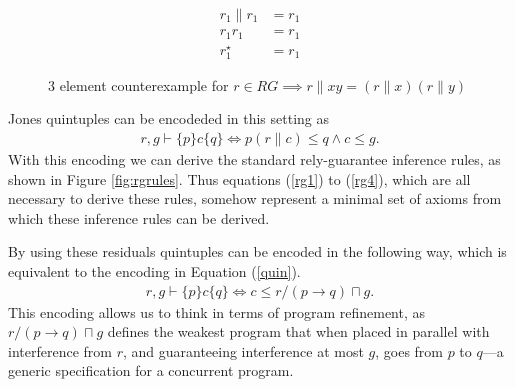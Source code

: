 \documentclass{llncs}
\begin{document}
\begin{figure}[t]
\centering
\begin{minipage}{0.24\textwidth}
\end{minipage}
\begin{minipage}{0.24\textwidth}
\begin{align*}
r_1 \| r_1 &= r_1\\
r_1 r_1 &= r_1\\
r_1^\star &= r_1
\end{align*}
\end{minipage}
\caption{3 element counterexample for $r \in RG \implies r\|xy = (r\|x)(r\|y)$}
\label{fig:rg3}
\end{figure}

Jones quintuples can be encodeded in this setting as
\begin{align}
r, g \vdash \{p\} c \{q\} \iff p(r\|c) \le q \land c \le g. \label{quin}
\end{align}
With this encoding we can derive the standard rely-guarantee inference
rules, as shown in Figure \ref{fig:rgrules}. Thus equations
(\ref{rg1}) to (\ref{rg4}), which are all necessary to derive these
rules, somehow represent a minimal set of axioms from which these
inference rules can be derived.

By using these residuals quintuples can be encoded in the following way,
which is equivalent to the encoding in Equation (\ref{quin}).
\begin{align}
r, g \vdash \{p\} c \{q\} \iff c \le r/(p \rightarrow q) \sqcap g \label{refine}.
\end{align}
This encoding allows us to think in terms of program refinement, as
$r/(p \rightarrow q) \sqcap g$ defines the weakest program that when
placed in parallel with interference from $r$, and guaranteeing
interference at most $g$, goes from $p$ to $q$---a generic
specification for a concurrent program.
\end{document}
